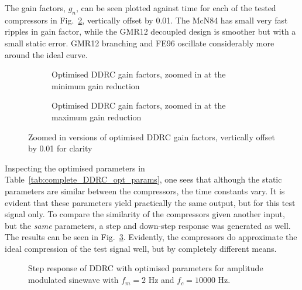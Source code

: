 \documentclass[../main2.tex]{subfiles}
\providecommand{\rootdir}{..}
\begin{document}
The gain factors, $g_n$, can be seen plotted against time for each of the tested compressors in Fig.~\ref{fig:complete_DDRC_opt_gain}, vertically offset by 0.01. The McN84 has small very fast ripples in gain factor, while the GMR12 decoupled design is smoother but with a small static error. GMR12 branching and FE96 oscillate considerably more around the ideal curve.

\begin{figure}
\captionsetup{justification=centering}
\begin{subfigure}{\linewidth}
\centering
\centerline{}
\caption{Optimised DDRC gain factors, zoomed in at the minimum gain reduction}
\end{subfigure}

\par\bigskip

\captionsetup{justification=centering}
\begin{subfigure}{\linewidth}
\centering
\centerline{}
\caption{Optimised DDRC gain factors, zoomed in at the maximum gain reduction}
\label{fig:complete_DDRC_opt_gain}
\end{subfigure}

\caption{Zoomed in versions of optimised DDRC gain factors, vertically offset by 0.01 for clarity}
\label{fig:complete_DDRC_opt_gain}
\end{figure}

Inspecting the optimised parameters in Table~\ref{tab:complete_DDRC_opt_params}, one sees that although the static parameters are similar between the compressors, the time constants vary. It is evident that these parameters yield practically the same output, but for this test signal only. To compare the similarity of the compressors given another input, but the \emph{same} parameters, a step and down-step response was generated as well. The results can be seen in Fig.~\ref{fig:complete_DDRC_opt_step_response}. Evidently, the compressors do approximate the ideal compression of the test signal well, but by completely different means. 
\begin{figure}[h]
\centerline{}
\caption{Step response of DDRC with optimised parameters for amplitude modulated sinewave with $f_m=2$ Hz and $f_c=10000$ Hz.}
\label{fig:complete_DDRC_opt_step_response}
\end{figure}

\end{document}
